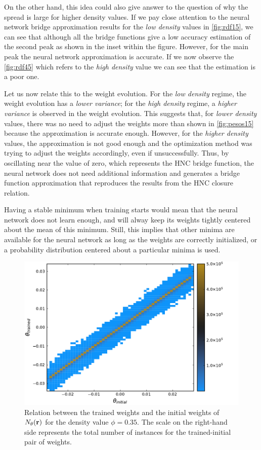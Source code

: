 On the other hand, this idea could also give answer to the question of why the spread
is large for higher density values. If we pay close attention to the neural network bridge
approximation results for the \emph{low density} values in \autoref{fig:rdf15}, we can see 
that although all the bridge functions give a low accuracy estimation of the second peak as shown in the inset within the figure. However, for the main peak the neural network 
approximation is accurate.
If we now observe the \autoref{fig:rdf45} which refers to the \emph{high density} value
we can see that the estimation is a poor one.

Let us now relate this to the weight evolution. For the \emph{low density} regime, the 
weight evolution has a \emph{lower variance}; for the \emph{high density} regime, a \emph{higher variance} is observed in the weight evolution.
This suggests that, for \emph{lower density} values, there was no need to adjust the
weights more than shown in \autoref{fig:pesos15} because the approximation is accurate
enough. However, for the \emph{higher density} values, the approximation is not good enough
and the optimization method was trying to adjust the weights accordingly, even if
unsuccessfully.
Thus, by oscillating near the value of zero, which represents the HNC bridge function,
the neural network does not need additional information and generates a bridge function 
approximation that reproduces the results from the HNC closure relation.

Having a stable minimum when training starts would mean that the neural network does not
learn enough, and will alway keep its weights tightly centered about the mean of this
minimum. Still, this implies that other minima are available for the neural network as long
as the weights are correctly initialized, or a probability distribution centered about
a particular minima is used.

\begin{figure}[t]
    \includegraphics[width=\textwidth]{figuras/capitulo-3/weights_phi=0.35.pdf}
    \caption[Comparison between weights, $\phi=0.35$.]{Relation between the trained weights and the initial weights of $N_{\theta}(\mathbf{r})$ for the density value $\phi=0.35$. The scale on the right-hand side represents the total number of instances for the trained-initial pair of weights.}
    \label{fig:pesos35}
\end{figure}


